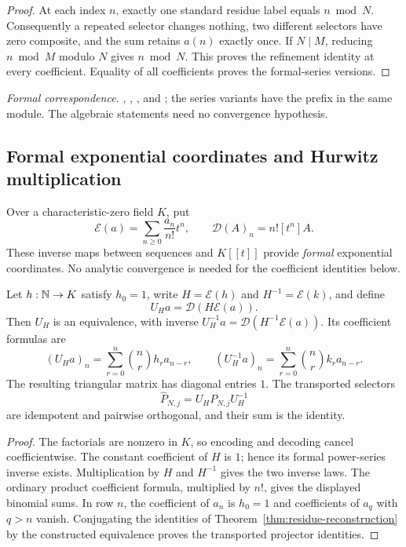 \begin{proof}
At each index $n$, exactly one standard residue label equals $n\bmod N$.
Consequently a repeated selector changes nothing, two different selectors have
zero composite, and the sum retains $a(n)$ exactly once. If $N\mid M$, reducing
$n\bmod M$ modulo $N$ gives $n\bmod N$. This proves the refinement identity
at every coefficient. Equality of all coefficients proves the formal-series
versions.
\end{proof}

\begingroup\small\raggedright
\noindent\emph{Formal correspondence.}
,
,
, and
; the series variants have the
prefix  in the same module.
The algebraic statements need no convergence hypothesis.
\par\endgroup

\subsection{Formal exponential coordinates and Hurwitz multiplication}

Over a characteristic-zero field $K$, put
\[
\mathcal E(a)=\sum_{n\geq0}\frac{a_n}{n!}t^n,
\qquad \mathcal D(A)_n=n![t^n]A.
\]
These inverse maps between sequences and $K[[t]]$ provide \emph{formal}
exponential coordinates. No analytic convergence is needed for the coefficient
identities below.

\begin{theorem}
\label{thm:egf-coordinates}
Let $h:\mathbb N\to K$ satisfy $h_0=1$, write $H=\mathcal E(h)$ and
$H^{-1}=\mathcal E(k)$, and define
\[
U_Ha=\mathcal D(H\mathcal E(a)).
\]
Then $U_H$ is an equivalence, with inverse
$U_H^{-1}a=\mathcal D(H^{-1}\mathcal E(a))$. Its coefficient formulas are
\[
(U_Ha)_n=\sum_{r=0}^{n}\binom nr h_r a_{n-r},\qquad
(U_H^{-1}a)_n=\sum_{r=0}^{n}\binom nr k_r a_{n-r}.
\]
The resulting triangular matrix has diagonal entries $1$. The transported
selectors
\[
\widehat P_{N,j}=U_HP_{N,j}U_H^{-1}
\]
are idempotent and pairwise orthogonal, and their sum is the identity.
\end{theorem}

\begin{proof}
The factorials are nonzero in $K$, so encoding and decoding cancel
coefficientwise. The constant coefficient of $H$ is $1$; hence its formal
power-series inverse exists. Multiplication by $H$ and $H^{-1}$ gives the two
inverse laws. The ordinary product coefficient formula, multiplied by $n!$,
gives the displayed binomial sums. In row $n$, the coefficient of $a_n$ is
$h_0=1$ and coefficients of $a_q$ with $q>n$ vanish. Conjugating the identities
of Theorem~\ref{thm:residue-reconstruction} by the constructed equivalence proves
the transported projector identities.
\end{proof}

